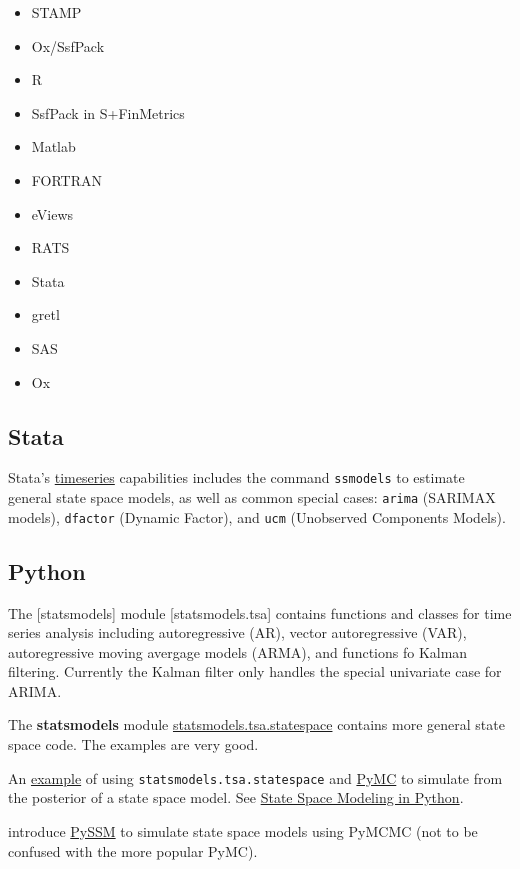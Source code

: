 \documentclass[]{book}
\providecommand{\tightlist}{%
  \setlength{\itemsep}{0pt}\setlength{\parskip}{0pt}}
\begin{document}
\begin{itemize}
\tightlist
\item
  STAMP \autocite{Mendelssohn2011a}
\item
  Ox/SsfPack \autocite{Pelagatti2011a}
\item
  R \autocite{PetrisPetrone2011a}
\item
  SsfPack in S+FinMetrics \autocite{Zivot2011a}
\item
  Matlab \autocite{PengAston2011a}
\item
  FORTRAN \autocite{Bell2011a}
\item
  eViews \autocite{Bossche2011a}
\item
  RATS \autocite{Doan2011a}
\item
  Stata \autocite{DrukkerGates2011a}
\item
  gretl \autocite{Lucchetti2011a}
\item
  SAS \autocite{Selukar2011a}
\item
  Ox \autocite{Bos2011a}
\end{itemize}

\subsection{Stata}\label{stata}

Stata's \href{http://www.stata.com/manuals14/ts.pdf}{timeseries}
capabilities includes the command \texttt{ssmodels} to estimate general
state space models, as well as common special cases: \texttt{arima}
(SARIMAX models), \texttt{dfactor} (Dynamic Factor), and \texttt{ucm}
(Unobserved Components Models).

\subsection{Python}\label{python}

The {[}statsmodels{]} module {[}statsmodels.tsa{]} contains functions
and classes for time series analysis including autoregressive (AR),
vector autoregressive (VAR), autoregressive moving avergage models
(ARMA), and functions fo Kalman filtering. Currently the Kalman filter
only handles the special univariate case for ARIMA.

The \textbf{statsmodels} module
\href{http://www.statsmodels.org/dev/statespace.html\#}{statsmodels.tsa.statespace}
contains more general state space code. The examples are very good.

An
\href{http://pages.uoregon.edu/cfulton/posts/state_space_mh.html}{example}
of using \texttt{statsmodels.tsa.statespace} and
\href{http://pymcmc.readthedocs.io/en/latest/}{PyMC} to simulate from
the posterior of a state space model. See
\href{http://pages.uoregon.edu/cfulton/posts/state_space_python.html}{State
Space Modeling in Python}.

\textcite{StricklandBurdettMengersenEtAl2014a} introduce
\href{https://bitbucket.org/christophermarkstrickland/pyssm}{PySSM} to
simulate state space models using PyMCMC (not to be confused with the
more popular PyMC).

\printbibliography
\end{document}

